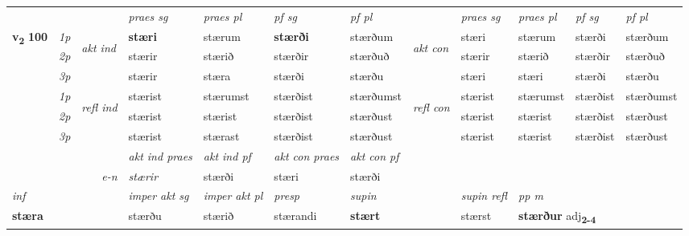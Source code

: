 \begin{longtable}[l]{X>{\footnotesize\itshape}llXXXXlXXXX}
 \midrule
 & &   & \textit{praes sg}  & \textit{praes pl}    & \textit{ pf sg} & \textit{pf pl} & & \textit{praes sg}  & \textit{praes pl}    & \textit{pf sg} & \textit{pf pl }  \\ \cmidrule{4-7} \cmidrule{9-12}
 \multirow{2}{*}{{{\textbf{v{\textsubscript{2}}} \Large{\textbf{100}}}}}  & 1p & \multirow{3}{*}{\begin{turn}{90}\textit{akt ind}\end{turn}} & \textbf{stæri} & stærum & \textbf{stærði} & stærðum & \multirow{3}{*}{\begin{turn}{90}\textit{akt con}\end{turn}} &stæri & stærum & stærði & stærðum\\*
 & 2p &  &  stærir  & stærið & stærðir & stærðuð & & stærir & stærið & stærðir & stærðuð \\*
 & 3p &  & stærir & stæra & stærði & stærðu & & stæri & stæri& stærði & stærðu \\*
\cmidrule{4-7} \cmidrule{9-12}
 & 1p & \multirow{3}{*}{\begin{turn}{90}\textit{refl ind}\end{turn}}  & stærist & stærumst & stærðist & stærðumst & \multirow{3}{*}{\begin{turn}{90}\textit{refl con}\end{turn}}  &stærist & stærumst & stærðist & stærðumst \\*
 & 2p &  & stærist & stærist & stærðist & stærðust & &stærist & stærist & stærðist & stærðust \\*
 & 3p  & & stærist & stærast & stærðist & stærðust & & stærist & stærist& stærðist & stærðust \\*
\cmidrule{4-7} \cmidrule{9-12}

   && &  \textit{akt ind praes} & \textit{akt ind pf} & \textit{akt con praes} & \textit{akt con pf} \\*
\multicolumn{3}{r}{\textit{e-n}} & stærir & stærði & stæri & stærði \\*

\cmidrule{4-7}
   {\textit{inf}} & &  & \textit{imper akt sg} & \textit{imper akt pl}   & \textit{presp} & \textit{supin} && \textit{supin refl} & \textit{pp m} \\*
  {\textbf{stæra}} & && stærðu  & stærið   & stærandi &  \textbf{stært} && stærst & \multicolumn{2}{l}{\textbf{stærður} adj\textbf{\textsubscript{2-4}}} \\*

\midrule


\end{longtable}
